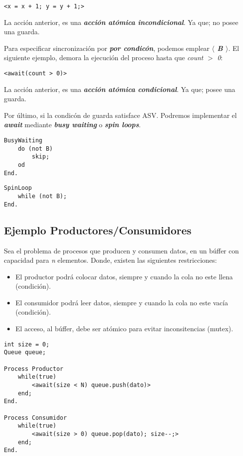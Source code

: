 \documentclass[a4paper, 10pt]{report}
\begin{document}
\begin{lstlisting}
<x = x + 1; y = y + 1;>
\end{lstlisting}

La acción anterior, es una \textbf{\emph{acción atómica incondicional}}. Ya que; no posee una guarda.

Para especificar sincronización por \textbf{\emph{por condicón}}, podemos emplear \textbf{\emph{$\langle$ B $\rangle$}}. El siguiente ejemplo, demora la ejecución del proceso hasta que \emph{count $>$ 0}:

\begin{lstlisting}
<await(count > 0)>
\end{lstlisting}
    

La acción anterior, es una \textbf{\emph{acción atómica condicional}}. Ya que; posee una guarda.

Por último, si la condicón de guarda satisface ASV. Podremos implementar el \textbf{\emph{await}} mediante \textbf{\emph{busy waiting}} o \textbf{\emph{spin loops}}.

\begin{multicols}{2}
\begin{lstlisting}
BusyWaiting
    do (not B)
        skip;
    od
End.
\end{lstlisting}
\columnbreak
\begin{lstlisting}
SpinLoop
    while (not B);
End.
\end{lstlisting}
\end{multicols}

\subsection{Ejemplo Productores/Consumidores}

Sea el problema de procesos que producen y consumen datos, en un búffer con capacidad para \emph{n} elementos. Donde, existen las siguientes restricciones:

\begin{itemize}
    \item El productor podrá colocar datos, siempre y cuando la cola no este llena (condición).
    \item El consumidor podrá leer datos, siempre y cuando la cola no este vacía (condición).
    \item El acceso, al búffer, debe ser atómico para evitar inconsitencias (mutex).
\end{itemize}

\begin{lstlisting}
int size = 0;
Queue queue;
    
Process Productor
    while(true)
        <await(size < N) queue.push(dato)>
    end;
End.

Process Consumidor
    while(true)
        <await(size > 0) queue.pop(dato); size--;>
    end;
End.
\end{lstlisting}
\end{document}
